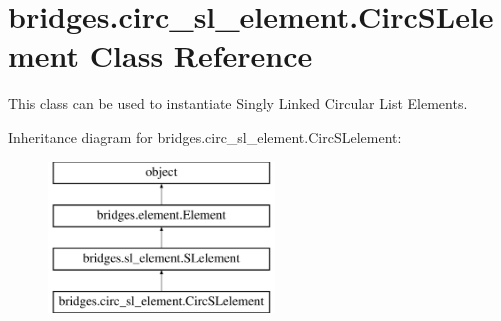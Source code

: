 \hypertarget{classbridges_1_1circ__sl__element_1_1_circ_s_lelement}{}\section{bridges.\+circ\+\_\+sl\+\_\+element.\+Circ\+S\+Lelement Class Reference}
\label{classbridges_1_1circ__sl__element_1_1_circ_s_lelement}


This class can be used to instantiate Singly Linked Circular List Elements.  


Inheritance diagram for bridges.\+circ\+\_\+sl\+\_\+element.\+Circ\+S\+Lelement\+:\begin{figure}[H]
\begin{center}
\leavevmode
\includegraphics[height=4.000000cm]{classbridges_1_1circ__sl__element_1_1_circ_s_lelement}
\end{center}
\end{figure}
